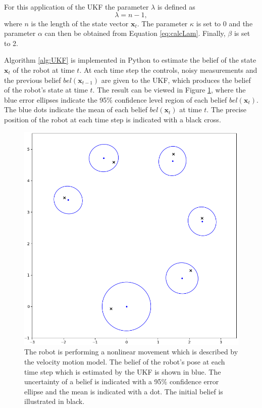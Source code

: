 \documentclass[12pt,oneside,openany,a4paper, %
afrikaans,english,
]{memoir}
\numberwithin{equation}{chapter}
\begin{document}
{For this application of the UKF the parameter $\lambda$ is defined as
\begin{equation}
\lambda = n - 1,
\end{equation}
where $n$ is the length of the state vector $\bm{x}_t$. The parameter $\kappa$ is set to 0 and the parameter $\alpha$ can then be obtained from Equation \ref{eq:calcLam}. Finally, $\beta$ is set to 2.

Algorithm \ref{alg:UKF} is implemented in Python to estimate the belief of the state $\bm{x}_t$ of the robot at time $t$.  At each time step the controls, noisy measurements and the previous belief $bel(\bm{x}_{t-1})$ are given to the UKF, which produces the belief of the robot's state at time $t$. The result can be viewed in Figure \ref{fig:resultUKF}, where the blue error ellipses indicate the 95\% confidence level region of each belief $bel(\bm{x}_t)$. The blue dots indicate the mean of each belief $bel(\bm{x}_t)$ at time $t$. The precise position of the robot at each time step is indicated with a black cross.
\begin{figure}[H]
  \includegraphics[width=0.7\linewidth]{Figures/result_UKF.png}
  \centering
  \caption[The result where the UKF is applied to solve a nonlinear localisation problem]{The robot is performing a nonlinear movement which is described by the velocity motion model. The belief of the robot's pose at each time step which is estimated by the UKF is shown in blue. The uncertainty of a belief is indicated with a 95\% confidence error ellipse and the mean is indicated with a dot. The initial belief is illustrated in black.}

\label{fig:resultUKF}
\end{figure}

}
\end{document}
